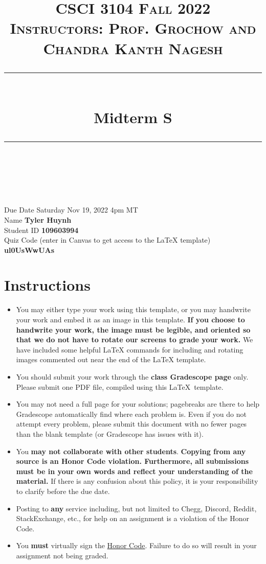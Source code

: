 \documentclass[11pt]{article}
\title{
\normalfont \normalsize 
\textsc{CSCI 3104 Fall 2022 \\ 
Instructors: Prof. Grochow and Chandra Kanth Nagesh} \\
[10pt] 
\rule{\linewidth}{0.5pt} \\[6pt] 
\huge Midterm S\standard \\
\rule{\linewidth}{2pt}  \\[10pt]
}
\date{}
\theoremstyle{definition}
\theoremstyle{definition}
\theoremstyle{definition}
\begin{document}

\maketitle


\noindent
Due Date \dotfill Saturday Nov 19, 2022 4pm MT \\
Name \dotfill \textbf{Tyler Huynh} \\
Student ID \dotfill \textbf{109603994} \\
Quiz Code (enter in Canvas to get access to the LaTeX template) \dotfill \textbf{ul0UsWwUAs}


\tableofcontents

\section*{Instructions}
 \begin{itemize}
	\item You may either type your work using this template, or you may handwrite your work and embed it as an image in this template. \textbf{If you choose to handwrite your work, the image must be legible, and oriented so that we do not have to rotate our screens to grade your work.} We have included some helpful LaTeX commands for including and rotating images commented out near the end of the LaTeX template.
	\item You should submit your work through the \textbf{class Gradescope page} only. Please submit one PDF file, compiled using this \LaTeX \ template.
	\item You may not need a full page for your solutions; pagebreaks are there to help Gradescope automatically find where each problem is. Even if you do not attempt every problem, please submit this document with no fewer pages than the blank template (or Gradescope has issues with it).

	\item You \textbf{may not collaborate with other students}. \textbf{Copying from any source is an Honor Code violation. Furthermore, all submissions must be in your own words and reflect your understanding of the material.} If there is any confusion about this policy, it is your responsibility to clarify before the due date. 

	\item Posting to \textbf{any} service including, but not limited to Chegg, Discord, Reddit, StackExchange, etc., for help on an assignment is a violation of the Honor Code.

	\item You \textbf{must} virtually sign the \hyperlink{HonorCode}{Honor Code}. Failure to do so will result in your assignment not being graded.
\end{itemize}
\end{document}

